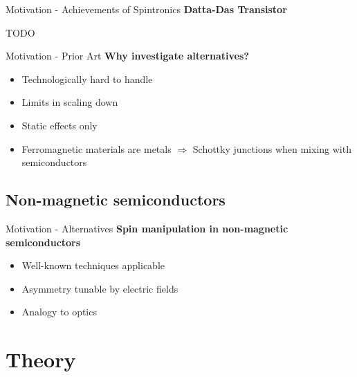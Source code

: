 \documentclass{beamer}
\begin{document}
\begin{frame}{Motivation - Achievements of Spintronics}
    \textbf{Datta-Das Transistor}

    TODO

\end{frame}

\begin{frame}{Motivation - Prior Art}
    \textbf{Why investigate alternatives?}

	\begin{itemize}
		\item Technologically hard to handle
        \item Limits in scaling down
        \item Static effects only
		\item Ferromagnetic materials are metals
            $\Rightarrow$ Schottky junctions when mixing with semiconductors
	\end{itemize}
\end{frame}

\subsection{Non-magnetic semiconductors}
\begin{frame}{Motivation - Alternatives}
    \textbf{Spin manipulation in non-magnetic semiconductors}

	\begin{itemize}
		\item Well-known techniques applicable
        \item Asymmetry tunable by electric fields
        \item Analogy to optics
	\end{itemize}
\end{frame}

\section{Theory}
\end{document}
